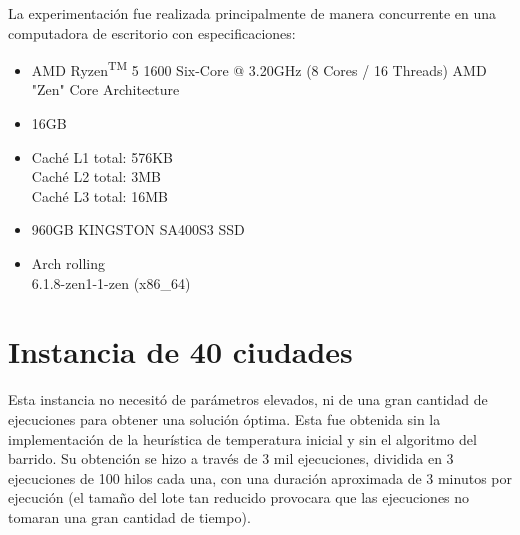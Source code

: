 \documentclass[a4paper]{report}
\begin{document}
La experimentaci\'on fue realizada principalmente de manera concurrente en una computadora de escritorio
con especificaciones:
  \begin{itemize} [label=$\scriptstyle{\scriptstyle{\scriptstyle{\scriptstyle{\square}}}}$]
  \item {} AMD Ryzen\textsuperscript{TM} 5 1600 Six-Core @ 3.20GHz (8 Cores / 16 Threads)
    \makebox[3cm][l]{} AMD "Zen" Core Architecture
  \item {} 16GB
  \item {} Caché L1 total: 576KB\\
    \makebox[5cm][l]{}    Caché L2 total: 3MB\\
    \makebox[5cm][l]{}    Caché L3 total: 16MB
  \item {} 960GB KINGSTON SA400S3 SSD\\
  \item {} Arch rolling\\
     6.1.8-zen1-1-zen (x86\_64)
  \end{itemize}


\section{Instancia de 40 ciudades}
Esta instancia no necesit\'o de par\'ametros elevados, ni de una gran cantidad
de ejecuciones para obtener una soluci\'on \'optima. Esta fue obtenida sin la
implementaci\'on de la heur\'istica de temperatura inicial y sin el algoritmo
del barrido. Su obtenci\'on se hizo a trav\'es de 3 mil ejecuciones, dividida
en 3 ejecuciones de 100 hilos cada una, con una duraci\'on aproximada de 3
minutos por ejecuci\'on (el tama\~no del lote tan reducido provocara que las
ejecuciones no tomaran una gran cantidad de tiempo).
\end{document}

